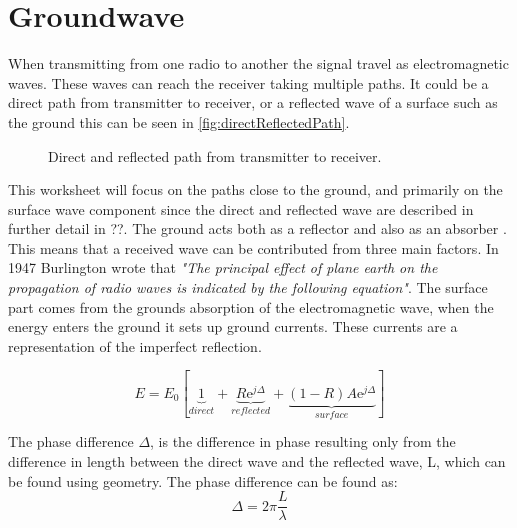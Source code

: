 \chapter{Groundwave}

When transmitting from one radio to another the signal travel as electromagnetic waves. These waves can reach the receiver taking multiple paths. It could be a direct path from transmitter to receiver, or a reflected wave of a surface such as the ground this can be seen in \autoref{fig:directReflectedPath}. 

\begin{figure}[H]
\centering

\caption{Direct and reflected path from transmitter to receiver.}
\label{fig:directReflectedPath}
\end{figure}

This worksheet will focus on the paths close to the ground, and primarily on the surface wave component since the direct and reflected wave are described in further detail in ??. The ground acts both as a reflector and also as an absorber \citep{Bullington}. This means that a received wave can be contributed from three main factors. In 1947 Burlington wrote that \textit{"The principal effect of plane earth on the propagation of radio waves is indicated by the following equation"}\citep{Bullington}. The surface part comes from the grounds absorption of the electromagnetic wave, when the energy enters the ground it sets up ground currents. These currents are a representation of the imperfect reflection.    

\begin{equation}
E=E_0\left[\underbrace{1}_{direct}+\underbrace{R\text{e}^{j\Delta}}_{reflected}+\underbrace{(1-R)A\text{e}^{j\Delta}}_{surface}\right]
\end{equation}
\begin{where}
\end{where}

The phase difference $\Delta$, is the difference in phase resulting only from the difference in length between the direct wave and the reflected wave, L, which can be found using geometry. The phase difference can be found as:
\begin{equation}
\Delta =2\pi \frac{L}{\lambda}
\end{equation}
\begin{where}
\end{where}

